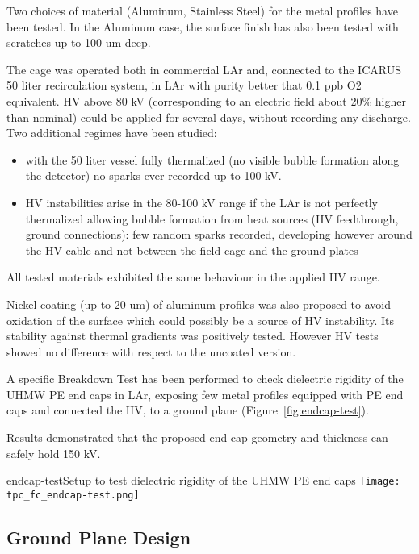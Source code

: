Two choices of material (Aluminum, Stainless Steel) for the metal profiles have been tested. In the Aluminum case, the surface finish has also been tested with scratches up to 100 um deep. 

The cage was operated both in commercial LAr and, connected to the ICARUS 50 liter recirculation system, in LAr  with purity  better that 0.1 ppb O2 equivalent. HV above 80 kV (corresponding to an electric field about 20\% higher than nominal) could be applied for several days, without recording any discharge. Two additional regimes have been studied:
\begin{itemize}	
\item  with the 50 liter vessel fully thermalized (no visible bubble formation along the detector) no sparks ever recorded up to 100 kV.
\item  HV instabilities arise in the 80-100 kV range if the LAr is not perfectly thermalized allowing bubble formation from heat sources (HV feedthrough, ground connections): few random sparks recorded, developing however around the HV cable and not between the field cage and the ground plates
\end{itemize}

All tested materials exhibited the same behaviour in the applied HV range. 

Nickel coating (up to 20 um) of aluminum profiles was also proposed  to avoid oxidation of the surface which could possibly be a source of HV instability. Its stability against  thermal gradients was positively tested. However HV tests showed no difference with respect to the uncoated version.

A specific Breakdown Test has been performed to check dielectric rigidity of the UHMW PE end caps in LAr, exposing few metal profiles equipped with PE end caps and connected the HV, to a ground plane (Figure~\ref{fig:endcap-test}).

Results demonstrated that the proposed end cap geometry and thickness can safely hold 150 kV.

\begin{cdrfigure}{endcap-test}{Setup to test dielectric rigidity of the UHMW PE end caps}
\texttt{[image: tpc\_fc\_endcap-test.png]}
\end{cdrfigure}





\subsection{Ground Plane Design}

